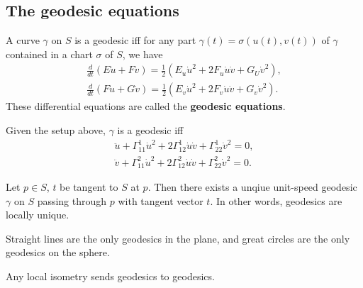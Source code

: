 \subsection{The geodesic equations}
\begin{theorem}
    A curve $\gamma $ on $S$ is a geodesic iff for any part $\gamma (t)= \sigma(u(t),v(t))$ of $\gamma $ contained in a chart $\sigma$ of $S$, we have 
    \begin{gather}
        \frac{d}{dt}(E\dot u +F\dot v) =\frac{1}{2}(E_u \dot u^2+2F_u \dot u \dot v+ G_U \dot v^2),\\
        \frac{d}{dt}(F\dot u+G\dot v) =\frac{1}{2}(E_v \dot u ^2+2F_v \dot u \dot v +G_v \dot v^2).
    \end{gather}These differential equations are called the \textbf{geodesic equations}.
\end{theorem}
\begin{prop}
    Given the setup above, $\gamma $ is a geodesic iff 
    \begin{gather}
        \ddot u + \Gamma _{11}^1 \dot u ^2 +2 \Gamma _{12}^1 \dot u \dot v + \Gamma _{22}^1 \dot v ^2=0,\\
        \ddot v + \Gamma _{11}^2 \dot u ^2 +2 \Gamma _{12}^2 \dot u \dot v + \Gamma _{22}^2 \dot v ^2=0.
    \end{gather}
\end{prop}
\begin{prop}
    Let $p \in S$, $t$ be tangent to $S$ at $p$. Then there exists a unqiue unit-speed geodesic $\gamma $ on $S$ passing through $p$ with tangent vector $t$. In other words, geodesics are locally unique.
\end{prop}
\begin{example}
    Straight lines are the only geodesics in the plane, and great circles are the only geodesics on the sphere.
\end{example}
\begin{cor}
    Any local isometry sends geodesics to geodesics.
\end{cor}

